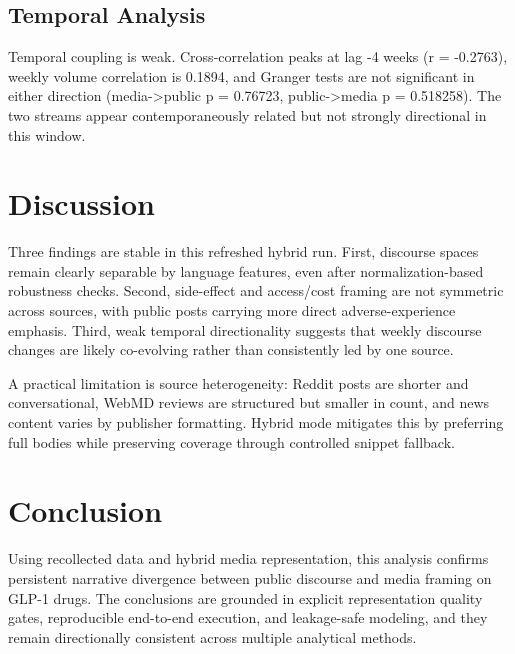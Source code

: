 \documentclass[10pt,letterpaper,twocolumn]{article}
\begin{document}
\subsection{Temporal Analysis}
Temporal coupling is weak. Cross-correlation peaks at lag -4 weeks (r = -0.2763), weekly volume correlation is 0.1894, and Granger tests are not significant in either direction (media->public p = 0.76723, public->media p = 0.518258). The two streams appear contemporaneously related but not strongly directional in this window.

\section{Discussion}
Three findings are stable in this refreshed hybrid run. First, discourse spaces remain clearly separable by language features, even after normalization-based robustness checks. Second, side-effect and access/cost framing are not symmetric across sources, with public posts carrying more direct adverse-experience emphasis. Third, weak temporal directionality suggests that weekly discourse changes are likely co-evolving rather than consistently led by one source.

A practical limitation is source heterogeneity: Reddit posts are shorter and conversational, WebMD reviews are structured but smaller in count, and news content varies by publisher formatting. Hybrid mode mitigates this by preferring full bodies while preserving coverage through controlled snippet fallback.

\newpage
\section{Conclusion}
Using recollected data and hybrid media representation, this analysis confirms persistent narrative divergence between public discourse and media framing on GLP-1 drugs. The conclusions are grounded in explicit representation quality gates, reproducible end-to-end execution, and leakage-safe modeling, and they remain directionally consistent across multiple analytical methods.
\end{document}
